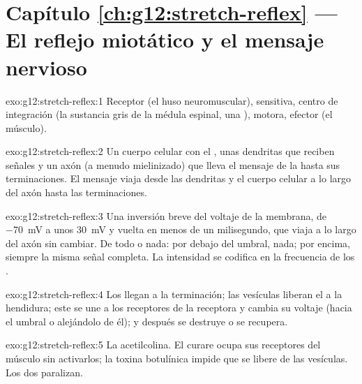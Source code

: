 \section*{Capítulo \ref{ch:g12:stretch-reflex} --- El reflejo miotático y el mensaje nervioso}

\begin{solution}{exo:g12:stretch-reflex:1}
Receptor (el huso neuromuscular),  sensitiva, centro de
integración (la sustancia gris de la médula espinal, una ),
 motora, efector (el músculo).
\end{solution}

\begin{solution}{exo:g12:stretch-reflex:2}
Un cuerpo celular con el , unas dendritas que reciben señales y
un axón (a menudo mielinizado) que lleva el mensaje de la  hasta
sus terminaciones. El mensaje viaja desde las dendritas y el cuerpo
celular a lo largo del axón hasta las terminaciones.
\end{solution}

\begin{solution}{exo:g12:stretch-reflex:3}
Una inversión breve del voltaje de la membrana, de \qty{-70}{mV} a unos
\qty{+30}{mV} y vuelta en menos de un milisegundo, que viaja a lo largo
del axón sin cambiar. De todo o nada: por debajo del umbral, nada; por
encima, siempre la misma señal completa. La intensidad se codifica en
la frecuencia de los .
\end{solution}

\begin{solution}{exo:g12:stretch-reflex:4}
Los  llegan a la terminación; las vesículas
liberan el  a la hendidura; este se une a los receptores
de la  receptora y cambia su voltaje (hacia el umbral o
alejándolo de él); y después se destruye o se recupera.
\end{solution}

\begin{solution}{exo:g12:stretch-reflex:5}
La acetilcolina. El curare ocupa sus receptores del músculo sin
activarlos; la toxina botulínica impide que se libere de las vesículas.
Los dos paralizan.
\end{solution}

